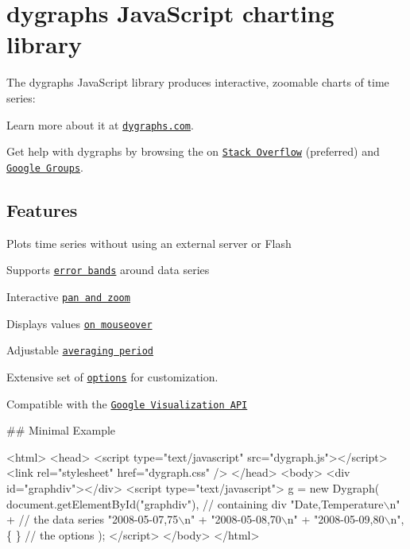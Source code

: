 \href{https://travis-ci.org/danvk/dygraphs}{\tt } \href{https://coveralls.io/r/danvk/dygraphs}{\tt } \hypertarget{md_src_website_node_modules_dygraphs_README_autotoc_md19}{}\section{dygraphs Java\+Script charting library}\label{md_src_website_node_modules_dygraphs_README_autotoc_md19}
The dygraphs Java\+Script library produces interactive, zoomable charts of time series\+:



Learn more about it at \href{http://www.dygraphs.com}{\tt dygraphs.\+com}.

Get help with dygraphs by browsing the on \href{http://stackoverflow.com/questions/tagged/dygraphs?sort=votes&pageSize=50}{\tt Stack Overflow} (preferred) and \href{http://groups.google.com/group/dygraphs-users}{\tt Google Groups}.\hypertarget{md_src_website_node_modules_dygraphs_README_autotoc_md20}{}\subsection{Features}\label{md_src_website_node_modules_dygraphs_README_autotoc_md20}

\begin{DoxyItemize}
\item Plots time series without using an external server or Flash
\item Supports \href{http://dygraphs.com/tests/legend-values.html}{\tt error bands} around data series
\item Interactive \href{http://dygraphs.com/tests/link-interaction.html}{\tt pan and zoom}
\item Displays values \href{http://dygraphs.com/tests/legend-values.html}{\tt on mouseover}
\item Adjustable \href{http://dygraphs.com/tests/temperature-sf-ny.html}{\tt averaging period}
\item Extensive set of \href{http://www.dygraphs.com/options.html}{\tt options} for customization.
\item Compatible with the \href{http://dygraphs.com/data.html#datatable}{\tt Google Visualization A\+PI}
\end{DoxyItemize}

\#\# Minimal Example 
\begin{DoxyCode}
<html>
<head>
<script type="text/javascript" src="dygraph.js"></script>
<link rel="stylesheet" href="dygraph.css" />
</head>
<body>
<div id="graphdiv"></div>
<script type="text/javascript">
  g = new Dygraph(
        document.getElementById("graphdiv"),  // containing div
        "Date,Temperature\(\backslash\)n" +                // the data series
        "2008-05-07,75\(\backslash\)n" +
        "2008-05-08,70\(\backslash\)n" +
        "2008-05-09,80\(\backslash\)n",
        \{ \}                                   // the options
      );
</script>
</body>
</html>
\end{DoxyCode}


